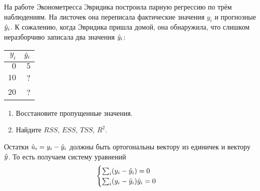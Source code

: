 \begin{problem}
На работе Эконометресса Эвридика построила парную регрессию по трём наблюдениям. На листочек она переписала фактические значения $y_i$ и прогнозные $\hat{y}_i$. К сожалению, когда Эвридика пришла домой, она обнаружила, что слишком неразборчиво записала два значения $\hat{y}_i$:

\begin{tabular}{rr}
\toprule
$y_i$ & $\hat{y}_i$ \\
\midrule
$0$ & $5$ \\
$10$ & ? \\
$20$ & ? \\
\bottomrule
\end{tabular}

\begin{enumerate}
\item Восстановите пропущенные значения.
\item Найдите $RSS$, $ESS$, $TSS$, $R^2$.
\end{enumerate}


\begin{sol}
Остатки $\hat u_i = y_i - \hat{y}_i$ должны быть ортогональны вектору из единичек и вектору $\hat{y}$. То есть получаем систему уравнений
\[
\begin{cases}
\sum_i (y_i - \hat{y}_i) = 0 \\
\sum_i (y_i - \hat{y}_i) \hat{y}_i = 0 \\
\end{cases}
\]

\end{sol}
\end{problem}

